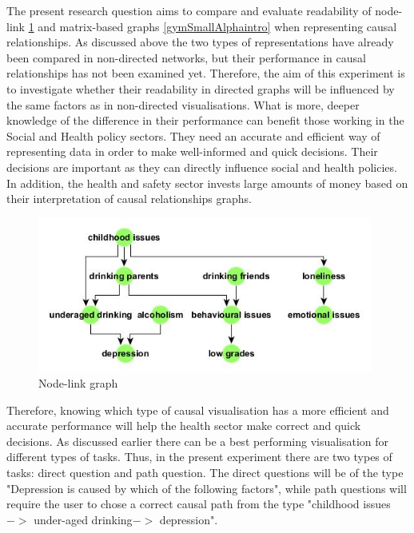 \documentclass{l4proj}
\begin{document}
The present research question aims to compare and evaluate readability of node-link \ref{drinkingIssuesSmallHierIntro} and matrix-based graphs \ref{gymSmallAlphaintro} when representing causal relationships. As discussed above the two types of representations have already been compared in non-directed networks, but their performance in causal relationships has not been examined yet. Therefore, the aim of this experiment is to investigate whether their readability in directed graphs will be influenced by the same factors as in non-directed visualisations. What is more, deeper knowledge of the difference in their performance can benefit those working in the Social and Health policy sectors. They need an accurate and efficient way of representing data in order to make well-informed and quick decisions. Their decisions are important as they can directly influence social and health policies. In addition, the health and safety sector invests large amounts of money based on their interpretation of causal relationships graphs.


\begin{figure}[H]
\centering
\includegraphics[width=11cm]{images/drinkingIssuesSmallHier.jpg}
\caption{Node-link graph}
\label{drinkingIssuesSmallHierIntro}
\end{figure}

Therefore, knowing which type of causal visualisation has a more efficient and accurate performance will help the health sector make correct and quick decisions. As discussed earlier there can be a best performing visualisation for different types of tasks. Thus, in the present experiment there are two types of tasks: direct question and path question. The direct questions will be of the type "Depression is caused by which of the following factors", while path questions will require the user to chose a correct causal path from the type "childhood issues $->$ under-aged drinking$->$ depression". 
\end{document}
